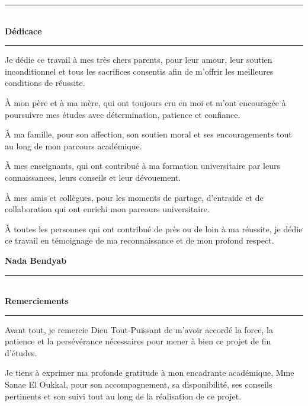 \documentclass[12pt,a4paper]{report}
\newcommand{\fronttitle}[1]{
\begin{center}
{\color{learnixblue}\rule{0.35\textwidth}{1pt}}\\[0.4cm]
{\fontsize{20}{24}\selectfont\bfseries\color{learnixdark} #1}\\[0.2cm]
{\color{learnixblue}\rule{0.18\textwidth}{1pt}}
\end{center}
}
\begin{document}


\clearpage
\thispagestyle{plain}

\fronttitle{Dédicace}

\vspace{1.5cm}

Je dédie ce travail à mes très chers parents, pour leur amour,
leur soutien inconditionnel et tous les sacrifices consentis afin de
m'offrir les meilleures conditions de réussite.

À mon père et à ma mère, qui ont toujours cru en moi et m'ont encouragée
à poursuivre mes études avec détermination, patience et confiance.

À ma famille, pour son affection, son soutien moral et ses encouragements
tout au long de mon parcours académique.

À mes enseignants, qui ont contribué à ma formation universitaire par
leurs connaissances, leurs conseils et leur dévouement.

À mes amis et collègues, pour les moments de partage, d'entraide et de
collaboration qui ont enrichi mon parcours universitaire.

À toutes les personnes qui ont contribué de près ou de loin à ma réussite,
je dédie ce travail en témoignage de ma reconnaissance et de mon profond respect.

\vspace{1cm}

\begin{flushright}
\textbf{Nada Bendyab}
\end{flushright}


\clearpage
\thispagestyle{plain}

\fronttitle{Remerciements}

\vspace{1.5cm}

Avant tout, je remercie Dieu Tout-Puissant de m'avoir accordé la force,
la patience et la persévérance nécessaires pour mener à bien ce projet
de fin d'études.

Je tiens à exprimer ma profonde gratitude à mon encadrante académique,
Mme Sanae El Oukkal, pour son accompagnement, sa disponibilité, ses
conseils pertinents et son suivi tout au long de la réalisation de ce projet.
\end{document}
